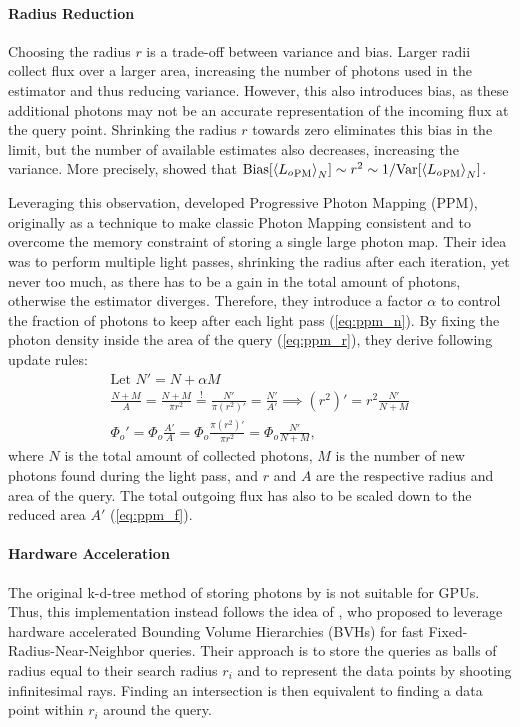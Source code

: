 \paragraph{Radius Reduction}
Choosing the radius $r$ is a trade-off between variance and bias.
Larger radii collect flux over a larger area, increasing the number of photons used in the estimator and thus reducing variance.
However, this also introduces bias, as these additional photons may not be an accurate representation of the incoming flux at the query point.
Shrinking the radius $r$ towards zero eliminates this bias in the limit, but the number of available estimates also decreases, increasing the variance.
More precisely, \textcite{knaus2011} showed that $\mathrm{Bias}\left[\estimator{{L_o}_\mathrm{PM}}\right] \sim r^2 \sim 1/\mathrm{Var}\left[\estimator{{L_o}_\mathrm{PM}}\right]$.

Leveraging this observation, \textcite{hachisuka2008} developed Progressive Photon Mapping (PPM), originally as a technique to make classic Photon Mapping consistent and to overcome the memory constraint of storing a single large photon map.
Their idea was to perform multiple light passes, shrinking the radius after each iteration, yet never too much, as there has to be a gain in the total amount of photons, otherwise the estimator diverges.
Therefore, they introduce a factor $\alpha$ to control the fraction of photons to keep after each light pass (\cref{eq:ppm_n}).
By fixing the photon density inside the area of the query (\cref{eq:ppm_r}), they derive following update rules:
\begin{subequations}
\begin{align}
    \text{Let } N' = N + \alpha M \label{eq:ppm_n}\\
    \frac{N + M}{A} = \frac{N + M}{\pi r^2} \stackrel{!}{=} \frac{N'}{\pi (r^2)'} = \frac{N'}{A'} \implies (r^2)' = r^2 \frac{N'}{N + M} \label{eq:ppm_r}\\
    \Phi_o' = \Phi_o \frac{A'}{A} = \Phi_o \frac{\pi (r^2)'}{\pi r^2} = \Phi_o \frac{N'}{N + M}, \label{eq:ppm_f}
\end{align}
\end{subequations}
where $N$ is the total amount of collected photons, $M$ is the number of new photons found during the light pass, and $r$ and $A$ are the respective radius and area of the query.
The total outgoing flux has also to be scaled down to the reduced area $A'$ (\cref{eq:ppm_f}).

\paragraph{Hardware Acceleration}
The original k-d-tree method of storing photons by \textcite{jensen1996} is not suitable for GPUs.
Thus, this implementation instead follows the idea of \textcite{evangelou2021}, who proposed to leverage hardware accelerated Bounding Volume Hierarchies (BVHs) for fast Fixed-Radius-Near-Neighbor queries.
Their approach is to store the queries as balls of radius equal to their search radius $r_i$ and to represent the data points by shooting infinitesimal rays.
Finding an intersection is then equivalent to finding a data point within $r_i$ around the query.

